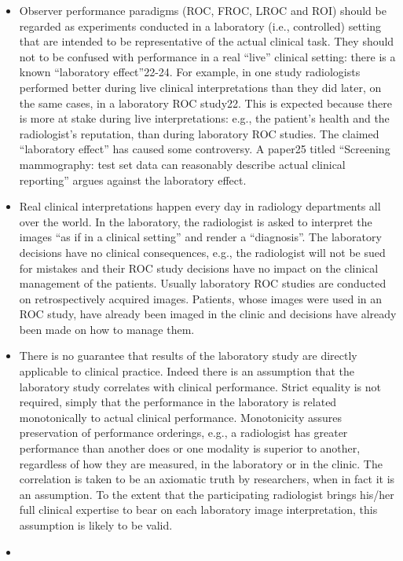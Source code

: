\documentclass[
]{book}
\begin{document}
\begin{itemize}
\item
  Observer performance paradigms (ROC, FROC, LROC and ROI) should be regarded as experiments conducted in a laboratory (i.e., controlled) setting that are intended to be representative of the actual clinical task. They should not to be confused with performance in a real ``live'' clinical setting: there is a known ``laboratory effect''22-24. For example, in one study radiologists performed better during live clinical interpretations than they did later, on the same cases, in a laboratory ROC study22. This is expected because there is more at stake during live interpretations: e.g., the patient's health and the radiologist's reputation, than during laboratory ROC studies. The claimed ``laboratory effect'' has caused some controversy. A paper25 titled ``Screening mammography: test set data can reasonably describe actual clinical reporting'' argues against the laboratory effect.
\item
  Real clinical interpretations happen every day in radiology departments all over the world. In the laboratory, the radiologist is asked to interpret the images ``as if in a clinical setting'' and render a ``diagnosis''. The laboratory decisions have no clinical consequences, e.g., the radiologist will not be sued for mistakes and their ROC study decisions have no impact on the clinical management of the patients. Usually laboratory ROC studies are conducted on retrospectively acquired images. Patients, whose images were used in an ROC study, have already been imaged in the clinic and decisions have already been made on how to manage them.
\item
  There is no guarantee that results of the laboratory study are directly applicable to clinical practice. Indeed there is an assumption that the laboratory study correlates with clinical performance. Strict equality is not required, simply that the performance in the laboratory is related monotonically to actual clinical performance. Monotonicity assures preservation of performance orderings, e.g., a radiologist has greater performance than another does or one modality is superior to another, regardless of how they are measured, in the laboratory or in the clinic. The correlation is taken to be an axiomatic truth by researchers, when in fact it is an assumption. To the extent that the participating radiologist brings his/her full clinical expertise to bear on each laboratory image interpretation, this assumption is likely to be valid.
\item

\end{itemize}
\end{document}
